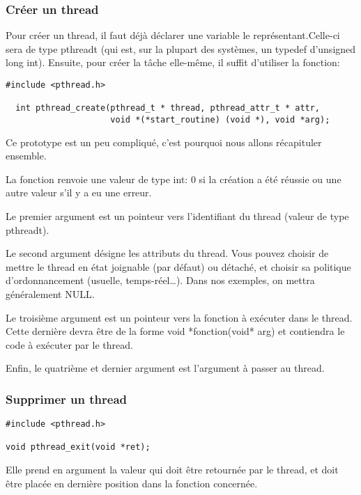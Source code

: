\documentclass[a4paper]{article}
\begin{document}
\subsubsection{Créer un thread}
Pour créer un thread, il faut déjà déclarer une variable le représentant.Celle-ci sera de type pthread\textunderscore{}t (qui est, sur la plupart des systèmes, un typedef d'unsigned long int). Ensuite, pour créer la tâche elle-même, il suffit d'utiliser la fonction:
\begin{lstlisting}
#include <pthread.h>

  int pthread_create(pthread_t * thread, pthread_attr_t * attr,
                     void *(*start_routine) (void *), void *arg);
\end{lstlisting}
Ce prototype est un peu compliqué, c'est pourquoi nous allons récapituler ensemble.
\begin{description}
  \item La fonction renvoie une valeur de type int: 0 si la création a été réussie ou une autre valeur s'il y a eu une erreur.
  \item Le premier argument est un pointeur vers l'identifiant du thread (valeur de type pthread\textunderscore{}t).
  \item Le second argument désigne les attributs du thread. Vous pouvez choisir de mettre le thread en état joignable (par défaut) ou détaché, et choisir sa politique d'ordonnancement (usuelle, temps-réel\ldots). Dans nos exemples, on mettra généralement NULL.
  \item Le troisième argument est un pointeur vers la fonction à exécuter dans le thread. Cette dernière devra être de la forme \guillemotleft{}void *fonction(void* arg)\guillemotright{} et contiendra le code à exécuter par le thread.
  \item Enfin, le quatrième et dernier argument est l'argument à passer au thread.
\end{description}
\subsubsection{Supprimer un thread}
\begin{lstlisting}
#include <pthread.h>

void pthread_exit(void *ret);
\end{lstlisting}
Elle prend en argument la valeur qui doit être retournée par le thread, et doit être placée en dernière position dans la fonction concernée.
\newpage
\end{document}
